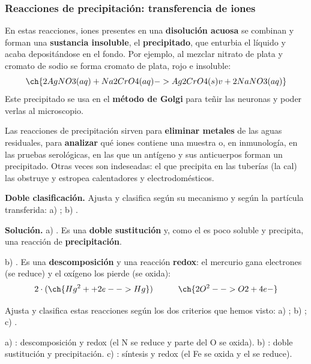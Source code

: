 \subsubsection{Reacciones de precipitación: transferencia de iones}

En estas reacciones, iones presentes en una \textbf{disolución acuosa} se combinan y forman una \textbf{sustancia insoluble}, el
\textbf{precipitado}, que enturbia el líquido y acaba depositándose en el fondo. Por ejemplo, al mezclar nitrato de plata y
cromato de sodio se forma cromato de plata, rojo e insoluble:
\[ \ch{2 AgNO3(aq) + Na2CrO4(aq) -> Ag2CrO4(s) v + 2 NaNO3(aq)} \]
Este precipitado se usa en el \textbf{método de Golgi} para teñir las neuronas y poder verlas al microscopio.

Las reacciones de precipitación sirven para \textbf{eliminar metales} de las aguas residuales, para \textbf{analizar} qué iones
contiene una muestra o, en inmunología, en las pruebas serológicas, en las que un antígeno y sus anticuerpos forman un precipitado.
Otras veces son indeseadas: el  que precipita en las tuberías (la cal) las obstruye y estropea calentadores y
electrodomésticos.

\begin{example}
    \textbf{Doble clasificación.} Ajusta y clasifica según su mecanismo y según la partícula transferida:
    a) ; b) .

    \textbf{Solución.} a) . Es una \textbf{doble sustitución} y, como el  es poco
    soluble y precipita, una reacción de \textbf{precipitación}.

    b) . Es una \textbf{descomposición} y una reacción \textbf{redox}: el mercurio gana electrones (se
    reduce) y el oxígeno los pierde (se oxida):
    \[ 2 \cdot (\ch{Hg^2+ + 2 e- -> Hg}) \qquad\quad \ch{2 O^2- -> O2 + 4 e-} \]
\end{example}

\begin{exercise}
    Ajusta y clasifica estas reacciones según los dos criterios que hemos visto: a) ;
    b) ; c) .
    \begin{solu}
        a) \textcolor{red}{}: descomposición y redox (el N se reduce y parte del O se oxida).
        b) \textcolor{red}{}: doble sustitución y precipitación.
        c) \textcolor{red}{}: síntesis y redox (el Fe se oxida y el  se reduce).
    \end{solu}
\end{exercise}

